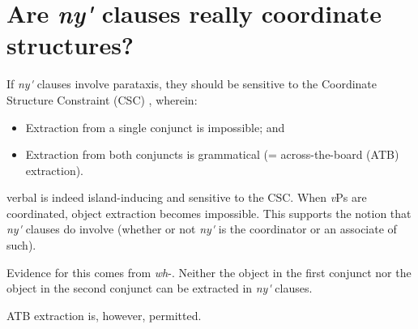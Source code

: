 \documentclass[output=paper,modfonts,nonflat,
colorlinks, citecolor=brown,
]{langsci/langscibook}
\begin{document}
\section{Are \textit{ny\'{\textturnv}\ng} clauses really coordinate structures?}\label{sec:duncan-et-al:4}

If  \textit{ny\'{\textturnv}\ng} clauses involve parataxis, they should be sensitive to the Coordinate Structure Constraint (CSC) \citep{ross1967constraints}, wherein:

\begin{itemize}
\item Extraction from a single conjunct is impossible; and
\item Extraction from both conjuncts is grammatical (= across-the-board (ATB) extraction).
\end{itemize}

\noindent {} verbal  is indeed island-inducing and sensitive to the CSC. When \textit{v}Ps are coordinated, object extraction becomes impossible. This supports the notion that \textit{ny\'{\textturnv}\ng} clauses do involve  (whether or not \textit{ny\'{\textturnv}\ng} is the coordinator or an associate of such).

Evidence for this comes from \textit{wh}-. Neither the object in the first conjunct nor the object in the second conjunct can be extracted in \textit{ny\'{\textturnv}\ng} clauses.

\ea\label{ex:duncan-et-al:13}
\z
\z

\noindent ATB extraction is, however, permitted.
\end{document}
